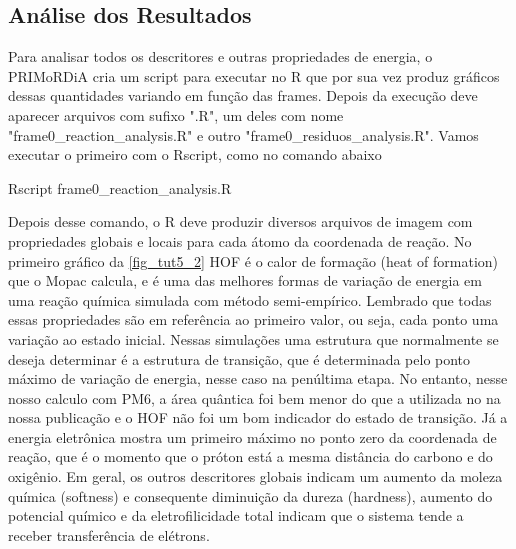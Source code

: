 \documentclass[a4paper,11pt]{refart}
\begin{document}
	 \subsection{Análise dos Resultados}
	 
	 Para analisar todos os descritores e outras propriedades de energia, o PRIMoRDiA cria um script para executar no R que por sua vez produz gráficos dessas quantidades variando em função das frames. Depois da execução deve aparecer arquivos com sufixo ".R", um deles com nome "frame0\_reaction\_analysis.R" e outro "frame0\_residuos\_analysis.R". Vamos executar o primeiro com o Rscript, como no comando abaixo
	 
	 \hspace*{-\leftmarginwidth}
	 \begin{minipage}{\fullwidth}
	 	\begin{commandshell}Rscript frame0\_reaction\_analysis.R\end{commandshell}
	 \end{minipage}
	 
	 Depois desse comando, o R deve produzir diversos arquivos de imagem com propriedades globais e locais para cada átomo da coordenada de reação. No primeiro gráfico da \autoref{fig_tut5_2} HOF é o calor de formação (heat of formation) que o Mopac calcula, e é uma das melhores formas de variação de energia em uma reação química simulada com método semi-empírico. Lembrado que todas essas propriedades são em referência ao primeiro valor, ou seja, cada ponto uma variação ao estado inicial. Nessas simulações uma estrutura que normalmente se deseja determinar é a estrutura de transição, que é determinada pelo ponto máximo de variação de energia, nesse caso na penúltima etapa. No entanto, nesse nosso calculo com PM6, a área quântica foi bem menor do que a utilizada no na nossa publicação e o HOF não foi um bom indicador do estado de transição. Já a energia eletrônica mostra um primeiro máximo no ponto zero da coordenada de reação, que é o momento que o próton está a mesma distância do carbono e do oxigênio. Em geral, os outros descritores globais indicam um aumento da moleza química (softness) e consequente diminuição da dureza (hardness), aumento do potencial químico e da eletrofilicidade total indicam que o sistema tende a receber transferência de elétrons.
	 
\end{document}
